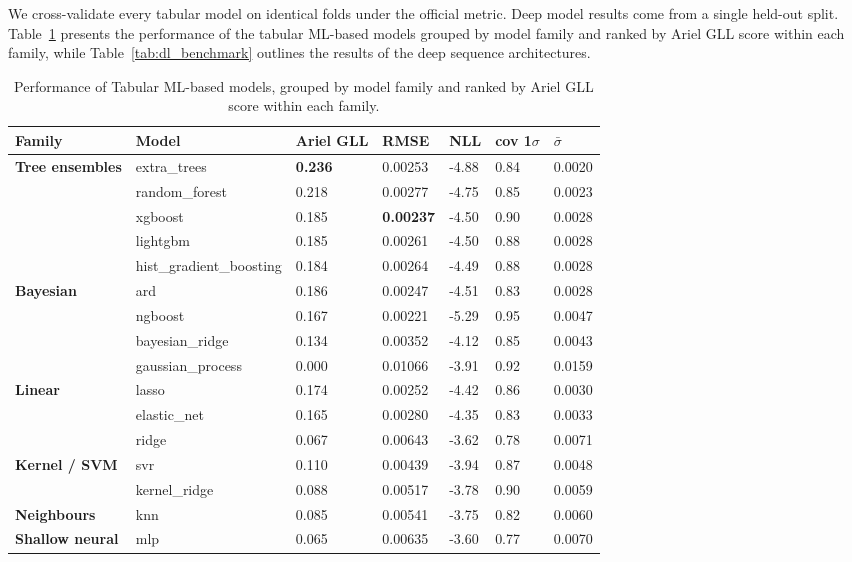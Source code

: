\documentclass[12pt]{article}
\begin{document}
We cross-validate every tabular model on identical folds under the official metric. Deep model results come from a single held-out split. Table~\ref{tab:ml_benchmark} presents the performance of the tabular ML-based models grouped by model family and ranked by Ariel GLL score within each family, while Table~\ref{tab:dl_benchmark} outlines the results of the deep sequence architectures.

\begin{table}[H]
\centering\small
\caption{Performance of Tabular ML-based models, grouped by model family and ranked by Ariel GLL score within each family.}
\label{tab:ml_benchmark}
\begin{tabular}{@{}l l l l l l l@{}}
\toprule
Family & Model & Ariel GLL & RMSE & NLL & cov 1$\sigma$ & $\bar{\sigma}$ \\
\midrule
\textbf{Tree ensembles} & extra\_trees & \textbf{0.236} & 0.00253 & -4.88 & 0.84 & 0.0020 \\
& random\_forest & 0.218 & 0.00277 & -4.75 & 0.85 & 0.0023 \\
& xgboost & 0.185 & \textbf{0.00237} & -4.50 & 0.90 & 0.0028 \\
& lightgbm & 0.185 & 0.00261 & -4.50 & 0.88 & 0.0028 \\
& hist\_gradient\_boosting & 0.184 & 0.00264 & -4.49 & 0.88 & 0.0028 \\
\midrule
\textbf{Bayesian} & ard & 0.186 & 0.00247 & -4.51 & 0.83 & 0.0028 \\
& ngboost & 0.167 & 0.00221 & -5.29 & 0.95 & 0.0047 \\
& bayesian\_ridge & 0.134 & 0.00352 & -4.12 & 0.85 & 0.0043 \\
& gaussian\_process & 0.000 & 0.01066 & -3.91 & 0.92 & 0.0159 \\
\midrule
\textbf{Linear} & lasso & 0.174 & 0.00252 & -4.42 & 0.86 & 0.0030 \\
& elastic\_net & 0.165 & 0.00280 & -4.35 & 0.83 & 0.0033 \\
& ridge & 0.067 & 0.00643 & -3.62 & 0.78 & 0.0071 \\
\midrule
\textbf{Kernel / SVM} & svr & 0.110 & 0.00439 & -3.94 & 0.87 & 0.0048 \\
& kernel\_ridge & 0.088 & 0.00517 & -3.78 & 0.90 & 0.0059 \\
\midrule
\textbf{Neighbours} & knn & 0.085 & 0.00541 & -3.75 & 0.82 & 0.0060 \\
\midrule
\textbf{Shallow neural} & mlp & 0.065 & 0.00635 & -3.60 & 0.77 & 0.0070 \\
\bottomrule
\end{tabular}
\end{table}
\end{document}
